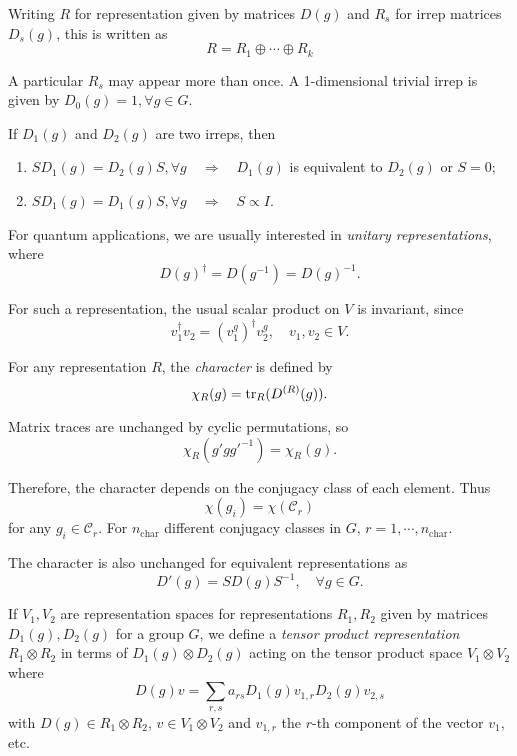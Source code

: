 \documentclass[a4paper,11pt]{article}
\begin{document}
	Writing $R$ for representation given by matrices $D(g)$ and $R_s$ for irrep matrices $D_s(g)$, this is written as 
	\[
		R = R_1 \oplus \cdots \oplus R_k
	\]
	
	A particular $R_s$ may appear more than once. A 1-dimensional trivial irrep is given by $D_0(g) = 1, \forall g \in G$.
	
	\begin{lem}
		If $D_1(g)$ and $D_2(g)$ are two irreps, then
		\begin{enumerate}
			\item $S D_1 (g) = D_2(g) S, \forall g \quad \Rightarrow\quad D_1 (g)$ is equivalent to $D_2(g)$ or $S=0$;
			\item $S D_1(g) = D_1(g) S, \forall g \quad \Rightarrow \quad S \propto I$. 
		\end{enumerate}
	\end{lem}

	For quantum applications, we are usually interested in \emph{unitary representations}, where
	\[
		D(g)^\dagger = D(g^{-1}) = D(g)^{-1}.
	\]
	
	For such a representation, the usual scalar product on $V$ is invariant, since
	\[
		v_1^\dagger v_2 = (v_1^g)^\dagger v_2^g, \quad v_1, v_2 \in V.
	\]
	 
	\begin{defi}
		For any representation $R$, the \emph{character} is defined by
		\[
			\chi_R (g) = \tr_R (D ^{(R)}(g)).
		\]
	\end{defi}

	\begin{cor}
		Matrix traces are unchanged by cyclic permutations, so
		\[
			\chi_R (g' g g'^{-1}) = \chi_R(g).
		\]

		Therefore, the character depends on the conjugacy class of each element. Thus
		\[
			\chi(g_i) = \chi(\mathcal{C}_r)
		\]
		for any $g_i \in \mathcal{C}_r$. For $n _{\text{char}}$ different conjugacy classes in $G$, $r = 1, \cdots, n _{\text{char}}$.

		The character is also unchanged for equivalent representations as 
		\[
			D'(g) = S D(g) S^{-1}, \quad \forall g \in G.
		\]
	\end{cor}
	
	\begin{defi}
		If $V_1, V_2$ are representation spaces for representations $R_1, R_2$ given by matrices $D_1(g), D_2(g)$ for a group $G$, we define a \emph{tensor product representation} $R_1 \otimes R_2$ in terms of $D_1(g) \otimes D_2(g)$ acting on the tensor product space $V_1 \otimes V_2$ where
		\[
			D(g) v = \sum _{r,s} a _{rs} D_1(g) v _{1,r} D_2(g) v _{2,s}
		\]
		with $D(g)\in R_1 \otimes R_2$, $v \in V_1 \otimes V_2$ and $v _{1,r}$ the $r$-th component of the vector $v_1$, etc.
	\end{defi}
\end{document}
